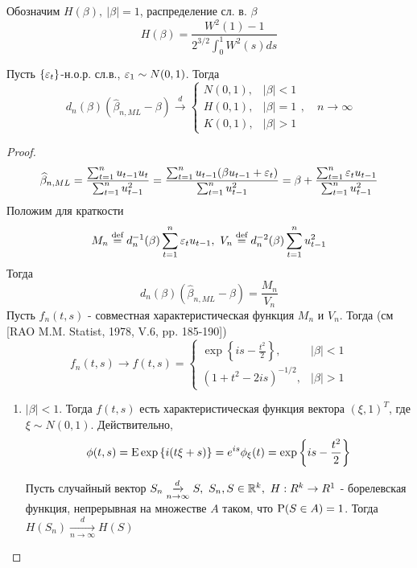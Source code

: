 Обозначим $H(\beta),\ \left\lvert \beta\right\rvert =1$, распределение сл. в. $\beta$
\[H(\beta)=\frac{W^2(1)-1}{2^{3/2}\int_0^1W^2(s)ds}\]
\begin{theorem}
    Пусть $\{\eps_t\}$-н.о.р. сл.в., $\eps_1\sim N(0,1)$. Тогда
    \[d_n(\beta)(\widehat{\beta}_{n,ML}-\beta)\xrightarrow{d}\begin{cases}
        N(0,1),& \left\lvert \beta\right\rvert <1 \\
        H(0,1),& \left\lvert \beta\right\rvert =1 \\
        K(0,1),& \left\lvert \beta\right\rvert >1 
    \end{cases}, \quad n\rightarrow\infty\]
\end{theorem}
\begin{proof}
    \[\widehat{\beta}_{n,ML}=\frac{\sum_{t=1}^nu_{t-1}u_t}{\sum_{t=1}^nu_{t-1}^2}=\frac{\sum_{t=1}^nu_{t-1}(\beta u_{t-1}+\eps_t)}{\sum_{t=1}^nu_{t-1}^2}=\beta+\frac{\sum_{t=1}^n\eps_tu_{t-1}}{\sum_{t=1}^nu_{t-1}^2}\]
    Положим для краткости
    \[M_n\defeq d^{-1}_n(\beta)\sum_{t=1}^n\eps_tu_{t-1},\ V_n\defeq d^{-2}_n(\beta)\sum_{t=1}^nu^2_{t-1}\]
    Тогда 
    \[d_n(\beta)(\widehat{\beta}_{n,ML}-\beta)=\frac{M_n}{V_n}\]
    Пусть $f_n(t,s)$ - совместная характеристическая функция $M_n$ и $V_n$.
    Тогда (см [RAO M.M. Statist, 1978, V.6, pp. 185-190])
    \begin{equation}\label{def::mutual_char_func}
        f_n(t,s)\rightarrow f(t,s)=\begin{cases}
            \exp{\left\{is-\frac{t^2}{2}\right\}},& \left\lvert \beta\right\rvert <1 \\
            (1+t^2-2is)^{-1/2},& \left\lvert \beta\right\rvert >1
        \end{cases}
    \end{equation}
    \begin{enumerate}
        \item \underline{$\left\lvert \beta\right\rvert <1$}. Тогда $f(t,s)$ есть характеристическая
        функция вектора $(\xi,1)^T$, где $\xi\sim N(0,1)$. Действительно,
        \[\phi(t,s)=\E\exp{\left\{i(t\xi+s)\right\}}=e^{is}\phi_\xi(t)=\exp{\left\{is-\frac{t^2}{2}\right\}}\]
        \begin{theorem*}
            Пусть случайный вектор $S_n\underset{n\rightarrow\infty}{\xrightarrow{d}}S,\ S_n,S\in\R^k,\ H:R^k\rightarrow R^1$ - 
            борелевская функция, непрерывная на множестве $A$ таком, что $\P(S\in A)=1$. Тогда $H(S_n)\underset{n\rightarrow\infty}{\xrightarrow{d}}H(S)$

\end{theorem*}
\end{enumerate}
\end{proof}
